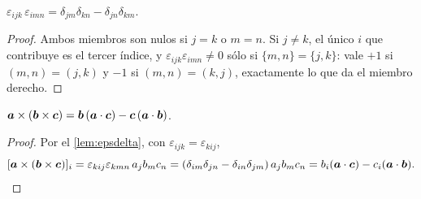 \begin{lema}
\label{lem:epsdelta}
$\varepsilon_{ijk}\,\varepsilon_{imn}=\delta_{jm}\delta_{kn}-\delta_{jn}\delta_{km}$.
\end{lema}

\begin{proof}
Ambos miembros son nulos si $j=k$ o $m=n$. Si $j\neq k$, el único $i$ que
contribuye es el tercer índice, y $\varepsilon_{ijk}\varepsilon_{imn}\neq0$
sólo si $\{m,n\}=\{j,k\}$: vale $+1$ si $(m,n)=(j,k)$ y $-1$ si
$(m,n)=(k,j)$, exactamente lo que da el miembro derecho.
\end{proof}

\begin{corolario}
\label{cor:bac}
$\bm{a}\times(\bm{b}\times\bm{c})=\bm{b}\,(\bm{a}\cdot\bm{c})-\bm{c}\,(\bm{a}\cdot\bm{b})$.
\end{corolario}

\begin{proof}
Por el \cref{lem:epsdelta}, con $\varepsilon_{ijk}=\varepsilon_{kij}$,
\[
[\bm{a}\times(\bm{b}\times\bm{c})]_{i}
=\varepsilon_{kij}\varepsilon_{kmn}\,a_{j}b_{m}c_{n}
=(\delta_{im}\delta_{jn}-\delta_{in}\delta_{jm})\,a_{j}b_{m}c_{n}
=b_{i}(\bm{a}\cdot\bm{c})-c_{i}(\bm{a}\cdot\bm{b}).\qedhere
\]
\end{proof}
